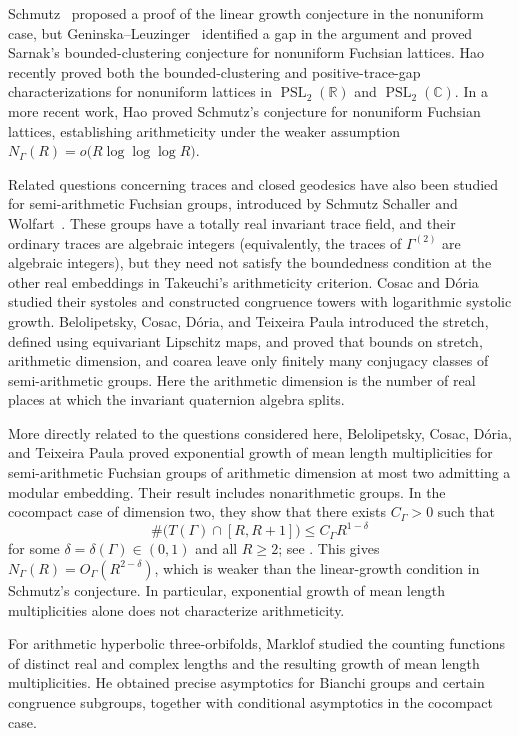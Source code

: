 \documentclass[reqno]{amsart}
\theoremstyle{remark}
\DeclareMathOperator{\PSL}{PSL}
\newcommand{\R}{\mathbb R}
\newcommand{\C}{\mathbb C}
\begin{document}
Schmutz~\cite{Schmutz} proposed a proof of the linear growth conjecture in the nonuniform case, but Geninska--Leuzinger~\cite{GeninskaLeuzinger} identified a gap in the argument and proved Sarnak's bounded-clustering conjecture for nonuniform Fuchsian lattices. Hao \cite[Theorem A]{HaoBoundedClustering} recently proved both the bounded-clustering and positive-trace-gap characterizations for nonuniform lattices in $\PSL_2(\R)$ and $\PSL_2(\C)$. In a more recent work, Hao \cite[Theorem A]{HaoTraceSets} proved Schmutz's conjecture for nonuniform Fuchsian lattices, establishing arithmeticity under the weaker assumption $N_\Gamma(R)=o\bigl(R\log\log\log R\bigr)$.

Related questions concerning traces and closed geodesics have also been studied for semi-arithmetic Fuchsian groups, introduced by Schmutz Schaller and Wolfart~\cite{SSW}. These groups have a totally real invariant trace field, and their ordinary traces are algebraic integers (equivalently, the traces of $\Gamma^{(2)}$ are algebraic integers), but they need not satisfy the boundedness condition at the other real embeddings in Takeuchi's arithmeticity criterion. Cosac and D\'oria \cite{CD} studied their systoles and constructed congruence towers with logarithmic systolic growth. Belolipetsky, Cosac, D\'oria, and Teixeira Paula \cite{BCDP} introduced the stretch, defined using equivariant Lipschitz maps, and proved that bounds on stretch, arithmetic dimension, and coarea leave only finitely many conjugacy classes of semi-arithmetic groups. Here the arithmetic dimension is the number of real places at which the invariant quaternion algebra splits.

More directly related to the questions considered here, Belolipetsky, Cosac, D\'oria, and Teixeira Paula \cite[Theorem 1.1]{BCDPmultiplicities} proved exponential growth of mean length multiplicities for semi-arithmetic Fuchsian groups of arithmetic dimension at most two admitting a modular embedding. Their result includes nonarithmetic groups. In the cocompact case of dimension two, they show that there exists $C_\Gamma>0$ such that
$$
\#\bigl(T(\Gamma)\cap[R,R+1]\bigr) \le  C_\Gamma R^{1-\delta}
$$
for some $\delta=\delta(\Gamma)\in(0,1)$ and all $R\ge2$; see \cite[Lemma 3.2]{BCDPmultiplicities}. This gives $N_\Gamma(R)=O_\Gamma(R^{2-\delta})$, which is weaker than the linear-growth condition in Schmutz's conjecture. In particular, exponential growth of mean length multiplicities alone does not characterize arithmeticity.

For arithmetic hyperbolic three-orbifolds, Marklof \cite{Marklof} studied the counting functions of distinct real and complex lengths and the resulting growth of mean length multiplicities. He obtained precise asymptotics for Bianchi groups and certain congruence subgroups, together with conditional asymptotics in the cocompact case.
\end{document}
